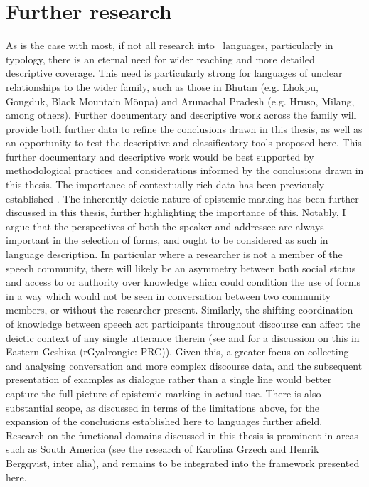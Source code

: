 \section{Further research}
As is the case with most, if not all research into \lfam\ languages, particularly in typology, there is an eternal need for wider reaching and more detailed descriptive coverage. This need is particularly strong for languages of unclear relationships to the wider family, such as those in Bhutan (e.g. Lhokpu, Gongduk, Black Mountain Mönpa) and Arunachal Pradesh (e.g. Hruso, Milang, among others). Further documentary and descriptive work across the family will provide both further data to refine the conclusions drawn in this thesis, as well as an opportunity to test the descriptive and classificatory tools proposed here. This further documentary and descriptive work would be best supported by methodological practices and considerations informed by the conclusions drawn in this thesis. The importance of contextually rich data has been previously established \cites{Grzech2020}{Bodnaruk2023}. The inherently deictic nature of epistemic marking has been further discussed in this thesis, further highlighting the importance of this. Notably, I argue that the perspectives of both the speaker and addressee are always important in the selection of forms, and ought to be considered as such in language description. In particular where a researcher is not a member of the speech community, there will likely be an asymmetry between both social status and access to or authority over knowledge which could condition the use of forms in a way which would not be seen in conversation between two community members, or without the researcher present. Similarly, the shifting coordination of knowledge between speech act participants throughout discourse can affect the deictic context of any single utterance therein (see  and  for a discussion on this in Eastern Geshiza (rGyalrongic: PRC)). Given this, a greater focus on collecting and analysing conversation and more complex discourse data, and the subsequent presentation of examples as dialogue rather than a single line would better capture the full picture of epistemic marking in actual use. There is also substantial scope, as discussed in terms of the limitations above, for the expansion of the conclusions established here to languages further afield. Research on the functional domains discussed in this thesis is prominent in areas such as South America (see the research of Karolina Grzech and Henrik Bergqvist, inter alia), and remains to be integrated into the framework presented here.

